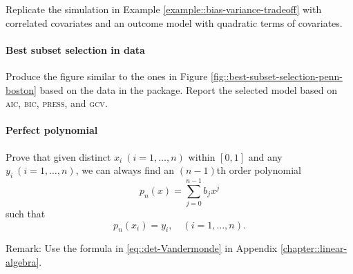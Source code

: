 Replicate the simulation in Example \ref{example::bias-variance-tradeoff} with correlated covariates and an outcome model with quadratic terms of covariates. 

\paragraph{Best subset selection in  data}

Produce the figure similar to the ones in Figure \ref{fig::best-subset-selection-penn-boston} based on the  data in the  package. Report the selected model based on \textsc{aic}, \textsc{bic}, \textsc{press}, and \textsc{gcv}. 


 \paragraph{Perfect polynomial}\label{hw12::perfect-polynomial}
 
Prove that given distinct $x_i \ (i=1, \ldots, n)$ within $[ 0,1 ]$ and any $y_i\ (i=1, \ldots, n)$, we can always find an $(n-1)$th order polynomial 
$$
p_n(x) = \sum_{j=0}^{n-1} b_j x^j
$$ 
such that 
$$
p_n(x_i) = y_i, \quad  (i=1, \ldots, n).
$$

Remark: Use the formula in \eqref{eq::det-Vandermonde} in Appendix \ref{chapter::linear-algebra}. 
 
 
 
 

